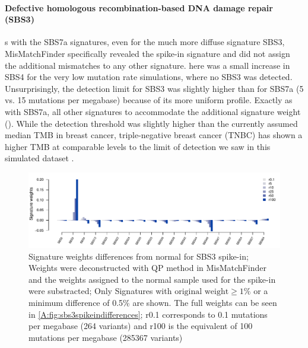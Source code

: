 \paragraph{Defective homologous recombination-based DNA damage repair (SBS3)}
\label{mmf-sec:mbcSim}

s with the SBS7a signatures, even for the much more diffuse signature SBS3, MisMatchFinder specifically revealed the spike-in signature and did not assign the additional mismatches to any other signature. here was a small increase in SBS4 for the very low mutation rate simulations, where no SBS3 was detected. Unsurprisingly, the detection limit for SBS3 was slightly higher than for SBS7a (5 vs. 15 mutations per megabase) because of its more uniform profile. Exactly as with SBS7a, all other signatures  to accommodate the additional signature weight (). While the detection threshold was slightly higher than the currently assumed median TMB in breast cancer,  triple-negative breast cancer (TNBC) has shown a higher TMB at comparable levels to the limit of detection we saw in this simulated dataset \cite{BarrosoSousa2020}.

\begin{figure}[ht]
\centering
\includegraphics[width=.99\linewidth]{Figures/MisMatchFinder/SBS3SpikeInSignatureDifferencesFocussed.pdf}
\caption[Signature weights differences from normal for SBS3 spike-in]{Signature weights differences from normal for SBS3 spike-in; Weights were deconstructed with QP method in MisMatchFinder and the weights assigned to the normal sample used for the spike-in were substracted; Only Signatures with $\text{original weight}\geq 1\%$ or a minimum difference of 0.5\% are shown. The full weights can be seen in \protect\autoref{A:fig:sbs3spikeindifferences}; r0.1 corresponds to 0.1 mutations per megabase (264 variants) and r100 is the equivalent of 100 mutations per megabase (285367 variants)}\label{fig:mmf-spikeSBS3signatures}
\end{figure}

